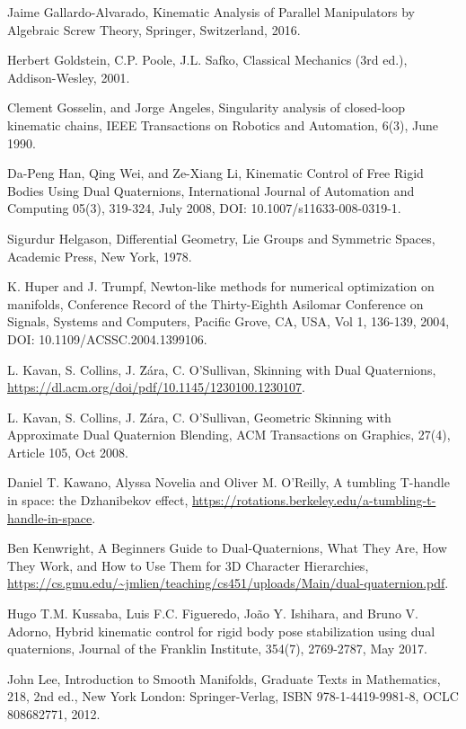 \documentclass[reqno,12pt]{amsart}
\begin{document}
\begin{thebibliography}{99}
 Jaime Gallardo-Alvarado, Kinematic Analysis of Parallel Manipulators by Algebraic Screw Theory, Springer, Switzerland, 2016.

 Herbert Goldstein, C.P. Poole, J.L. Safko, Classical Mechanics (3rd ed.), Addison-Wesley, 2001.

 Clement Gosselin, and Jorge Angeles, Singularity analysis of closed-loop kinematic chains, IEEE Transactions on Robotics and Automation, 6(3), June 1990.

 Da-Peng Han, Qing Wei, and Ze-Xiang Li, Kinematic Control of Free Rigid Bodies Using Dual Quaternions, International Journal of Automation and Computing
05(3), 319-324, July 2008, DOI: 10.1007/s11633-008-0319-1.

 Sigurdur Helgason, Differential Geometry, Lie Groups and Symmetric Spaces, Academic Press, New York, 1978.

 K. Huper and J. Trumpf, Newton-like methods for numerical optimization on manifolds, Conference Record of the Thirty-Eighth Asilomar Conference on Signals, Systems and Computers, Pacific Grove, CA, USA, Vol 1, 136-139, 2004, DOI: 10.1109/ACSSC.2004.1399106.

 L. Kavan, S. Collins, J. \u Z\'ara, C. O'Sullivan, Skinning with Dual Quaternions, \url{https://dl.acm.org/doi/pdf/10.1145/1230100.1230107}.

 L. Kavan, S. Collins, J. \u Z\'ara, C. O'Sullivan, Geometric Skinning with Approximate Dual Quaternion Blending, ACM Transactions on Graphics, 27(4), Article 105, Oct 2008.

 Daniel T. Kawano, Alyssa Novelia and Oliver M. O'Reilly, A tumbling T-handle in space: the Dzhanibekov effect, \url{https://rotations.berkeley.edu/a-tumbling-t-handle-in-space}.

 Ben Kenwright, A Beginners Guide to Dual-Quaternions, What They Are, How They Work, and How to Use Them for 3D Character Hierarchies, \url{https://cs.gmu.edu/~jmlien/teaching/cs451/uploads/Main/dual-quaternion.pdf}.

 Hugo T.M. Kussaba, Luis F.C. Figueredo, Jo\~ao Y. Ishihara, and Bruno V. Adorno, Hybrid kinematic control for rigid body pose stabilization using dual quaternions, Journal of the Franklin Institute, 354(7), 2769-2787, May 2017.

 John Lee, Introduction to Smooth Manifolds, Graduate Texts in Mathematics, 218, 2nd ed., New York London: Springer-Verlag, ISBN 978-1-4419-9981-8, OCLC 808682771, 2012.


\end{thebibliography}
\end{document}
